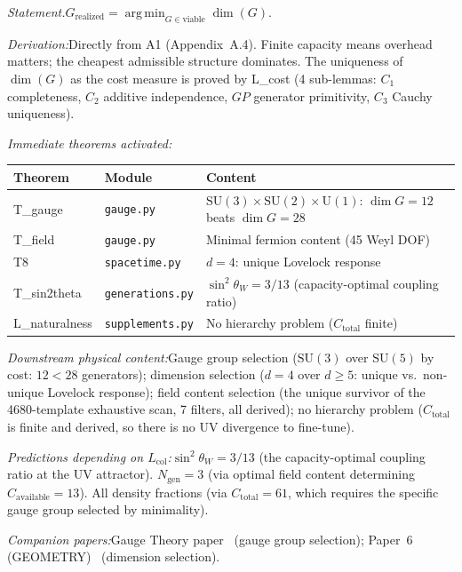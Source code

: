 \documentclass[11pt]{article}
\newcommand{\Ctot}{C_{\mathrm{total}}}
\newcommand{\sw}{\sin^2\!\theta_W}
\newcommand{\Ngen}{N_{\mathrm{gen}}}
\newcommand{\Lcol}{L_{\mathrm{col}}}
\newcommand{\SU}{\mathrm{SU}}
\newcommand{\U}{\mathrm{U}}
\DeclareMathOperator*{\argmin}{arg\,min}
\begin{document}
\begin{tcolorbox}[apfbox, title={$\Lcol$ $\longrightarrow$ Selection Principles}]
\textit{Statement.}\quad $G_{\mathrm{realized}} = \argmin_{G \in \mathrm{viable}} \dim(G)$.

\textit{Derivation:}\quad Directly from A1 (Appendix~A.4).  Finite capacity means overhead matters; the cheapest admissible structure dominates.  The uniqueness of $\dim(G)$ as the cost measure is proved by L\_cost (4 sub-lemmas: $C_1$ completeness, $C_2$ additive independence, $GP$ generator primitivity, $C_3$ Cauchy uniqueness).

\smallskip\noindent\textit{Immediate theorems activated:}
\begin{center}
\small
\renewcommand{\arraystretch}{1.15}
\begin{tabular}{lll}
\toprule
\textbf{Theorem} & \textbf{Module} & \textbf{Content} \\
\midrule
T\_gauge & \texttt{gauge.py} & $\SU(3)\!\times\!\SU(2)\!\times\!\U(1)$: $\dim G = 12$ beats $\dim G = 28$ \\
T\_field & \texttt{gauge.py} & Minimal fermion content (45 Weyl DOF) \\
T8 & \texttt{spacetime.py} & $d = 4$: unique Lovelock response \\
T\_sin2theta & \texttt{generations.py} & $\sw = 3/13$ (capacity-optimal coupling ratio) \\
L\_naturalness & \texttt{supplements.py} & No hierarchy problem ($\Ctot$ finite) \\
\bottomrule
\end{tabular}
\end{center}

\smallskip\noindent\textit{Downstream physical content:}\quad Gauge group selection ($\SU(3)$ over $\SU(5)$ by cost: $12 < 28$ generators); dimension selection ($d = 4$ over $d \ge 5$: unique vs.\ non-unique Lovelock response); field content selection (the unique survivor of the 4680-template exhaustive scan, 7 filters, all derived); no hierarchy problem ($\Ctot$ is finite and derived, so there is no UV divergence to fine-tune).

\smallskip\noindent\textit{Predictions depending on $\Lcol$:}\quad $\sw = 3/13$ (the capacity-optimal coupling ratio at the UV attractor).  $\Ngen = 3$ (via optimal field content determining $C_{\mathrm{available}} = 13$).  All density fractions (via $\Ctot = 61$, which requires the specific gauge group selected by minimality).

\smallskip\noindent\textit{Companion papers:}\quad Gauge Theory paper~\cite{PGT} (gauge group selection); Paper~6 (GEOMETRY)~\cite{P6} (dimension selection).
\end{tcolorbox}
\end{document}
